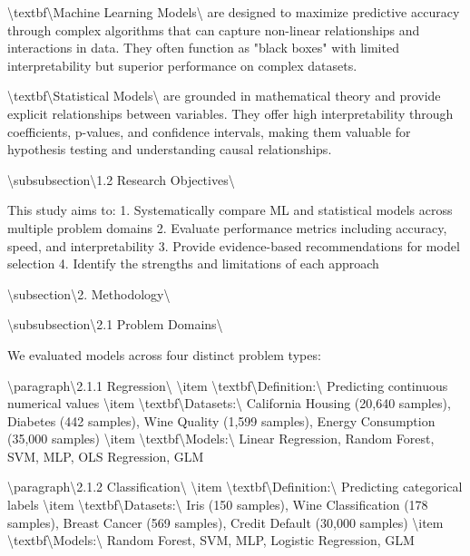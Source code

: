 \documentclass[11pt,a4paper]{article}
\begin{document}
\textbackslash{}textbf\textbackslash{}{Machine Learning Models\textbackslash{}} are designed to maximize predictive accuracy through complex algorithms that can capture non-linear relationships and interactions in data. They often function as "black boxes" with limited interpretability but superior performance on complex datasets.

\textbackslash{}textbf\textbackslash{}{Statistical Models\textbackslash{}} are grounded in mathematical theory and provide explicit relationships between variables. They offer high interpretability through coefficients, p-values, and confidence intervals, making them valuable for hypothesis testing and understanding causal relationships.

\textbackslash{}subsubsection\textbackslash{}{1.2 Research Objectives\textbackslash{}}

This study aims to:
1. Systematically compare ML and statistical models across multiple problem domains
2. Evaluate performance metrics including accuracy, speed, and interpretability
3. Provide evidence-based recommendations for model selection
4. Identify the strengths and limitations of each approach

\textbackslash{}subsection\textbackslash{}{2. Methodology\textbackslash{}}

\textbackslash{}subsubsection\textbackslash{}{2.1 Problem Domains\textbackslash{}}

We evaluated models across four distinct problem types:

\textbackslash{}paragraph\textbackslash{}{2.1.1 Regression\textbackslash{}}
\textbackslash{}item \textbackslash{}textbf\textbackslash{}{Definition:\textbackslash{}} Predicting continuous numerical values
\textbackslash{}item \textbackslash{}textbf\textbackslash{}{Datasets:\textbackslash{}} California Housing (20,640 samples), Diabetes (442 samples), Wine Quality (1,599 samples), Energy Consumption (35,000 samples)
\textbackslash{}item \textbackslash{}textbf\textbackslash{}{Models:\textbackslash{}} Linear Regression, Random Forest, SVM, MLP, OLS Regression, GLM

\textbackslash{}paragraph\textbackslash{}{2.1.2 Classification\textbackslash{}}
\textbackslash{}item \textbackslash{}textbf\textbackslash{}{Definition:\textbackslash{}} Predicting categorical labels
\textbackslash{}item \textbackslash{}textbf\textbackslash{}{Datasets:\textbackslash{}} Iris (150 samples), Wine Classification (178 samples), Breast Cancer (569 samples), Credit Default (30,000 samples)
\textbackslash{}item \textbackslash{}textbf\textbackslash{}{Models:\textbackslash{}} Random Forest, SVM, MLP, Logistic Regression, GLM
\end{document}
